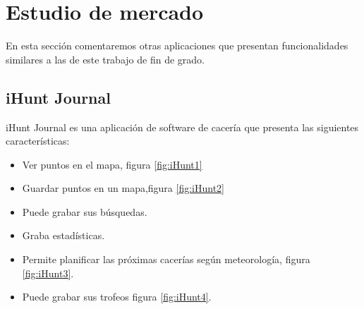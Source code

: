 \section{Estudio de mercado}
En esta sección comentaremos otras aplicaciones que presentan funcionalidades similares a las de este trabajo de fin de grado.



\subsection{iHunt Journal}

iHunt Journal es una aplicación de software de cacería que presenta las siguientes características: 
\begin{itemize}
\item Ver puntos en el mapa, figura \ref{fig:iHunt1}
\item Guardar puntos en un mapa,figura \ref{fig:iHunt2}
\item Puede grabar sus búsquedas.
\item Graba  estadísticas.
\item Permite planificar las próximas cacerías según meteorología, figura \ref{fig:iHunt3}.
\item Puede grabar sus trofeos figura \ref{fig:iHunt4}.

\end{itemize}

